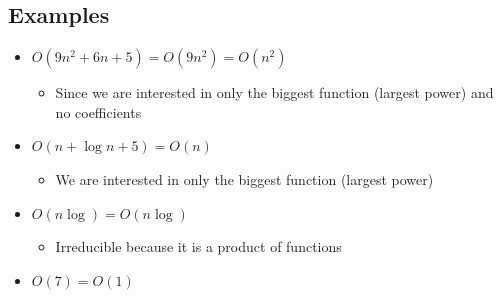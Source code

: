 \documentclass[11pt]{article}
\begin{document}
\subsection{Examples}
\begin{itemize}
    \item $O(9n^2+6n+5) = O(9n^2) = O(n^2)$ 
    \begin{itemize}
        \item Since we are interested in only the biggest function (largest power) and no coefficients
    \end{itemize} 
    \item $O(n+\log n +5) = O(n)$ 
    \begin{itemize}
        \item We are interested in only the biggest function (largest power)
    \end{itemize} 
    \item $O(n\log) = O(n\log)$ \begin{itemize}
        \item Irreducible because it is a product of functions
    \end{itemize} 
    \item $O(7) = O(1)$
\end{itemize}
\end{document}
